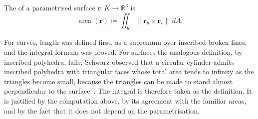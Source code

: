 \begin{definition}
\label{def:surface-area}
The  of a parametrised surface $\mathbf r\colon K\to\mathbb R^3$ is
\[
\operatorname{area}(\mathbf r)\coloneqq\iint_K\|\mathbf r_u\times\mathbf r_v\|\,dA .
\]
\end{definition}

For curves, length was defined first, as a supremum over inscribed broken lines, and the integral formula was proved. For surfaces the analogous definition, by inscribed polyhedra, fails: Schwarz observed that a circular cylinder admits inscribed polyhedra with triangular faces whose total area tends to infinity as the triangles become small, because the triangles can be made to stand almost perpendicular to the surface~\cite{schwarz1890}. The integral is therefore taken as the definition. It is justified by the computation above, by its agreement with the familiar areas, and by the fact that it does not depend on the parametrisation.

